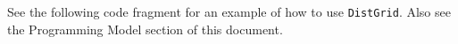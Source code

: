 

See the following code fragment for an example of
how to use {\tt DistGrid}.  Also see
the Programming Model section of this document.



